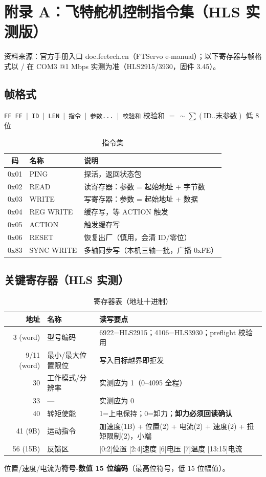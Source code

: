 \appendix

\section{附录 A：飞特舵机控制指令集（HLS 实测版）}\label{app:servo}
资料来源：官方手册入口 doc.feetech.cn（FTServo e-manual）；以下寄存器与帧格式以
 /  在 COM3 @1 Mbps 实测为准（HLS2915/3930，固件 3.45）。

\subsection{帧格式}
\begin{center}
\texttt{FF FF $\mid$ ID $\mid$ LEN $\mid$ 指令 $\mid$ 参数... $\mid$ 校验和}\qquad
校验和 $=\,\sim\!\sum(\text{ID..末参数})$ 低 8 位
\end{center}
\begin{table}[h]\centering
\caption{指令集}\label{tab:instr}
\begin{tabular}{cll}
\toprule
码 & 名称 & 说明 \\
\midrule
0x01 & PING & 探活，返回状态包 \\
0x02 & READ & 读寄存器：参数 = 起始地址 + 字节数 \\
0x03 & WRITE & 写寄存器：参数 = 起始地址 + 数据 \\
0x04 & REG WRITE & 缓存写，等 ACTION 触发 \\
0x05 & ACTION & 触发缓存写 \\
0x06 & RESET & 恢复出厂（慎用，会清 ID/零位） \\
0x83 & SYNC WRITE & 多轴同步写（本机三轴一批，广播 0xFE） \\
\bottomrule
\end{tabular}
\end{table}

\subsection{关键寄存器（HLS 实测）}
\begin{table}[h]\centering
\caption{寄存器表（地址十进制）}\label{tab:regs}
\begin{tabular}{rll}
\toprule
地址 & 名称 & 读写要点 \\
\midrule
3 (word) & 型号编码 & 6922=HLS2915；4106=HLS3930；preflight 校验用 \\
9/11 (word) & 最小/最大位置限位 & 写入目标越界即拒发 \\
30 & 工作模式/分辨率 & 实测应为 1（0--4095 全程） \\
33 & — & 实测应为 0 \\
40 & 转矩使能 & 1=上电保持；0=卸力；\textbf{卸力必须回读确认} \\
41 (9B) & 运动指令 & 加速度(1B) + 位置(2) + 电流(2) + 速度(2) + 扭矩限制(2)，小端 \\
56 (15B) & 反馈区 & [0:2]位置 [2:4]速度 [6]电压 [7]温度 [13:15]电流 \\
\bottomrule
\end{tabular}
\end{table}
位置/速度/电流为\textbf{符号-数值 15 位编码}（最高位符号，低 15 位幅值）。

